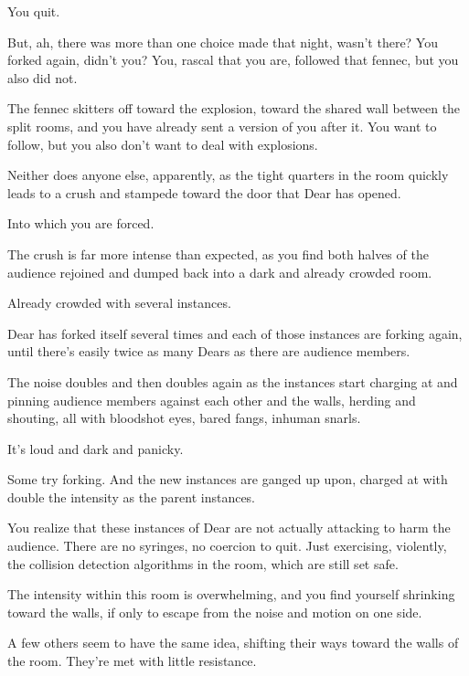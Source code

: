 \vfill

\begin{flushright}
\footnotesize
You quit.
\end{flushright}

\newpage
\null
\newpage
\null

\newpage

But, ah, there was more than one choice made that night, wasn't there? You forked again, didn't you? You, rascal that you are, followed that fennec, but you also did not.

The fennec skitters off toward the explosion, toward the shared wall between the split rooms, and you have already sent a version of you after it. You want to follow, but you also don't want to deal with explosions.

Neither does anyone else, apparently, as the tight quarters in the room quickly leads to a crush and stampede toward the door that Dear has opened.

Into which you are forced.

The crush is far more intense than expected, as you find both halves of the audience rejoined and dumped back into a dark and already crowded room.

Already crowded with several instances.

Dear has forked itself several times and each of those instances are forking again, until there's easily twice as many Dears as there are audience members.

The noise doubles and then doubles again as the instances start charging at and pinning audience members against each other and the walls, herding and shouting, all with bloodshot eyes, bared fangs, inhuman snarls.

It's loud and dark and panicky.

Some try forking. And the new instances are ganged up upon, charged at with double the intensity as the parent instances.

You realize that these instances of Dear are not actually attacking to harm the audience. There are no syringes, no coercion to quit. Just exercising, violently, the collision detection algorithms in the room, which are still set safe.

The intensity within this room is overwhelming, and you find yourself shrinking toward the walls, if only to escape from the noise and motion on one side.

A few others seem to have the same idea, shifting their ways toward the walls of the room. They're met with little resistance.

